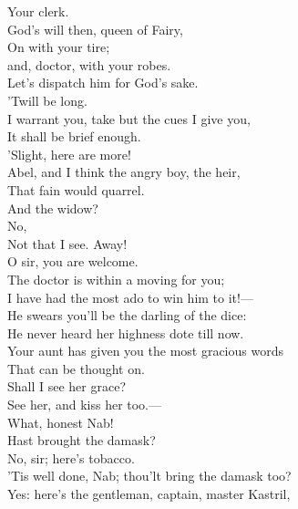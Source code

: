 \documentclass[a4paper,oneside]{memoir}
\begin{document}
\begin{drama*}
Your clerk.\\
\facespeaks {} God's will then, queen of Fairy,\\
On with your tire;\\
 and, doctor, with your robes.\\
Let's dispatch him for God's sake.\\
\subtlespeaks {} 'Twill be long.\\
\facespeaks I warrant you, take but the cues I give you,\\
It shall be brief enough.\\
 'Slight, here are more!\\
Abel, and I think the angry boy, the heir,\\
That fain would quarrel.\\
\subtlespeaks {} And the widow?\\
\facespeaks {} No,\\
Not that I see. Away!\\
 O sir, you are welcome.\\
The doctor is within a moving for you;\\
I have had the most ado to win him to it!---\\
He swears you'll be the darling of the dice:\\
He never heard her highness dote till now.\\
Your aunt has given you the most gracious words\\
That can be thought on.\\
\dapperspeaks {} Shall I see her grace?\\
\facespeaks See her, and kiss her too.---\\
 What, honest Nab!\\
Hast brought the damask?\\
\druggerspeaks {} No, sir; here's tobacco.\\
\facespeaks 'Tis well done, Nab; thou'lt bring the damask too?\\
\druggerspeaks Yes: here's the gentleman, captain, master Kastril,\\

\end{drama*}
\end{document}
